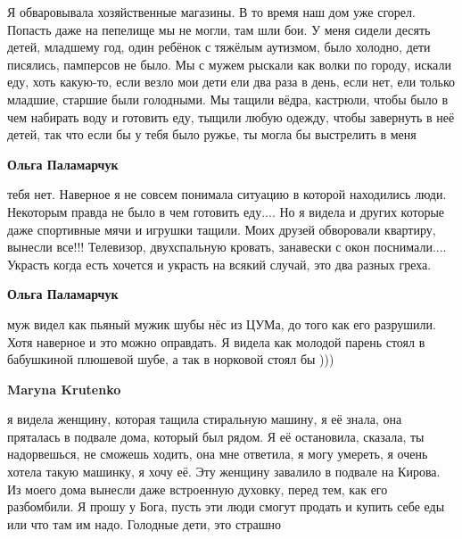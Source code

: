  
 
 
 
 

\qqSecCmt


Я обваровывала хозяйственные магазины. В то время наш дом уже сгорел. Попасть
даже на пепелище мы не могли, там шли бои. У меня сидели десять детей, младшему
год, один ребёнок с тяжёлым аутизмом, было холодно, дети писялись, памперсов не
было. Мы с мужем рыскали как волки по городу, искали еду, хоть какую-то, если
везло мои дети ели два раза в день, если нет, ели только младшие, старшие были
голодными. Мы тащили вёдра, кастрюли, чтобы было в чем набирать воду и готовить
еду, тыщили любую одежду, чтобы завернуть в неё детей, так что если бы у тебя
было ружье, ты могла бы выстрелить в меня

\begin{itemize} %
\textbf{Ольга Паламарчук} 

тебя нет. Наверное я не совсем понимала ситуацию в которой находились люди.
Некоторым правда не было в чем готовить еду.... Но я видела и других которые даже
спортивные мячи и игрушки тащили. Моих друзей обворовали квартиру, вынесли
все!!! Телевизор, двухспальную кровать, занавески с окон поснимали.... Украсть
когда есть хочется и украсть на всякий случай, это два разных греха.

\textbf{Ольга Паламарчук} 

муж видел как пьяный мужик шубы нёс из ЦУМа, до того как его разрушили. Хотя
наверное и это можно оправдать. Я видела как молодой парень стоял в бабушкиной
плюшевой шубе, а так в норковой стоял бы )))

\textbf{Maryna Krutenko} 

я видела женщину, которая тащила стиральную машину, я её знала, она пряталась в
подвале дома, который был рядом. Я её остановила, сказала, ты надорвешься, не
сможешь ходить, она мне ответила, я могу умереть, я очень хотела такую машинку,
я хочу её. Эту женщину завалило в подвале на Кирова. Из моего дома вынесли даже
встроенную духовку, перед тем, как его разбомбили. Я прошу у Бога, пусть эти
люди смогут продать и купить себе еды или что там им надо. Голодные дети, это
страшно

\end{itemize} %

